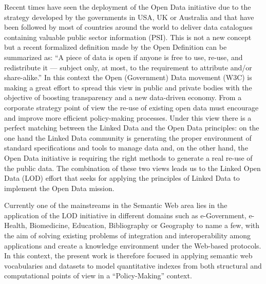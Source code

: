 Recent times have seen the deployment of the Open Data initiative due to the strategy 
developed by the governments in USA, UK or Australia and that have been followed by most of countries around the world to deliver data 
catalogues containing valuable public sector information (PSI). This is not a new concept but a recent formalized definition made 
by the Open Definition can be summarized as: ``A piece of data is open if anyone is free to use, re-use, and redistribute it — subject only, at most, to the requirement 
to attribute and/or share-alike.'' In this context the Open (Government) Data movement (W3C) is making a great effort 
to spread this view in public and private bodies with the objective of boosting transparency and a new data-driven economy. 
From a corporate strategy point of view the re-use of existing open data must encourage and improve 
more efficient policy-making processes. Under this view there is a perfect matching between the Linked Data and the Open Data 
principles: on the one hand the Linked Data community is generating the proper environment of standard 
specifications and tools to manage data and, on the other hand, the Open Data initiative is requiring 
the right methods to generate a real re-use of the public data. The combination of these 
two views leads us to the Linked Open Data (LOD) effort that seeks for applying the principles of 
Linked Data to implement the Open Data mission.

Currently one of the mainstreams in the Semantic Web area lies in the application of the LOD initiative in 
different domains such as  e-Government, e-Health, Biomedicine, Education, Bibliography or Geography to name a few,  
with the aim of solving existing problems of integration and interoperability among applications and create a 
knowledge environment under the Web-based protocols. In this context, the present work is therefore focused 
in applying semantic web vocabularies and datasets to model quantitative indexes from both structural 
and computational points of view in a ``Policy-Making'' context. 

